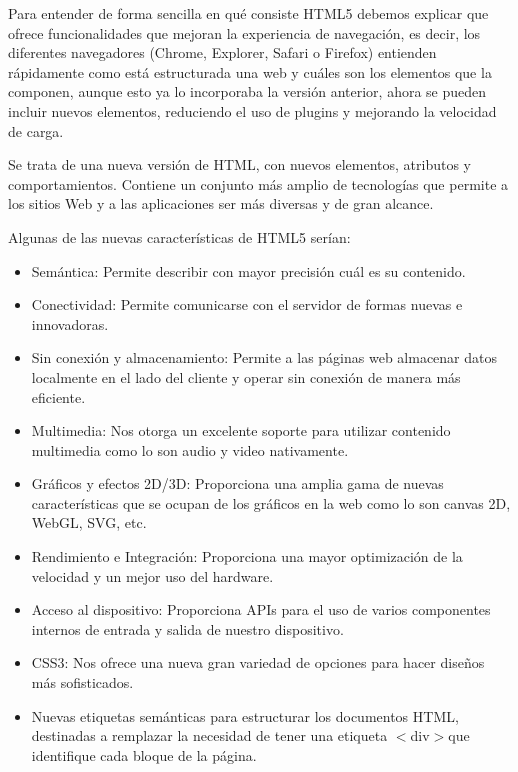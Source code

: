 \documentclass[a4paper, 12pt]{book}
\begin{document}
Para entender de forma sencilla en qué consiste HTML5 debemos explicar que ofrece funcionalidades que mejoran la experiencia de navegación, es decir, los diferentes navegadores (Chrome, Explorer, Safari o Firefox) entienden rápidamente como está estructurada una web y cuáles son los elementos que la componen, aunque esto ya lo incorporaba la versión anterior, ahora se pueden incluir nuevos elementos, reduciendo el uso de plugins y mejorando la velocidad de carga.

Se trata de una nueva versión de HTML, con nuevos elementos, atributos y comportamientos. Contiene un conjunto más amplio de tecnologías que permite a los sitios Web y a las aplicaciones ser más diversas y de gran alcance.

Algunas de las nuevas características de HTML5 serían:
\begin{itemize}


    \item Semántica: Permite describir con mayor precisión cuál es su contenido.
    
    \item Conectividad: Permite comunicarse con el servidor de formas nuevas e innovadoras.
    
    \item Sin conexión y almacenamiento: Permite a las páginas web almacenar datos localmente en el lado del cliente y operar sin conexión de manera más eficiente.
    
    \item Multimedia: Nos otorga un excelente soporte para utilizar contenido multimedia como lo son audio y video nativamente.
    
    \item Gráficos y efectos 2D/3D: Proporciona una amplia gama de nuevas características que se ocupan de los gráficos en la web como lo son canvas 2D, WebGL, SVG, etc.
    
    \item Rendimiento e Integración: Proporciona una mayor optimización de la velocidad y un mejor uso del hardware.
    
    \item Acceso al dispositivo: Proporciona APIs para el uso de varios componentes internos de entrada y salida de nuestro dispositivo.
    
    \item CSS3: Nos ofrece una nueva gran variedad de opciones para hacer diseños más sofisticados.

    \item Nuevas etiquetas semánticas para estructurar los documentos HTML, destinadas a remplazar la necesidad de tener una etiqueta $<$div$>$que identifique cada bloque de la página.
    

\end{itemize}
\end{document}
